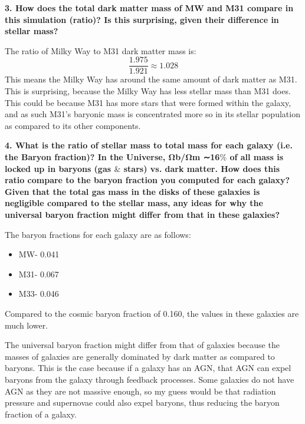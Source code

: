 \documentclass{article}
\begin{document}
\textbf{3. How does the total dark matter mass of MW and M31 compare in this simulation (ratio)? Is this surprising, given their difference in stellar mass?}

The ratio of Milky Way to M31 dark matter mass is: 
\begin{equation}
    \frac{1.975}{1.921} \approx 1.028
\end{equation}
This means the Milky Way has around the same amount of dark matter as M31. This is surprising, because the Milky Way has less stellar mass than M31 does. This could be because M31 has more stars that were formed within the galaxy, and as such M31's baryonic mass is concentrated more so in its stellar population as compared to its other components.  


\textbf{4. What is the ratio of stellar mass to total mass for each galaxy (i.e. the Baryon fraction)? In the Universe, Ωb/Ωm ∼16$\%$ of all mass is locked up in baryons (gas $\&$ stars) vs. dark matter. How does this ratio compare to the baryon fraction you computed for each galaxy? Given that the total gas mass in the disks of these galaxies is negligible compared to the stellar mass, any ideas for why the universal baryon fraction might differ from that in these galaxies?}

The baryon fractions for each galaxy are as follows: 

\begin{itemize}
    \item MW- 0.041
    \item M31- 0.067
    \item M33- 0.046 
\end{itemize}

Compared to the cosmic baryon fraction of 0.160, the values in these galaxies are much lower. 

The universal baryon fraction might differ from that of galaxies because the masses of galaxies are generally dominated by dark matter as compared to baryons. This is the case because if a galaxy has an AGN, that AGN can expel baryons from the galaxy through feedback processes. Some galaxies do not have AGN as they are not massive enough, so my guess would be that radiation pressure and supernovae could also expel baryons, thus reducing the baryon fraction of a galaxy. 
\end{document}
